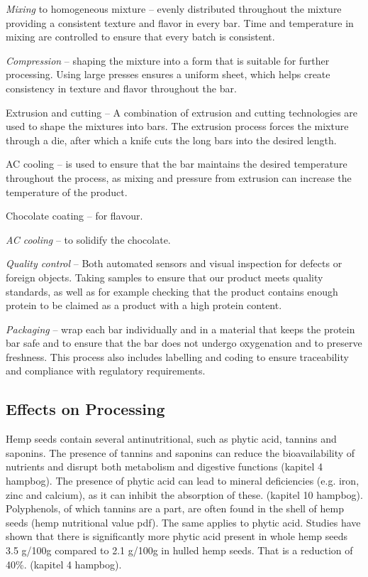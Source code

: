 \vspace{1em}
\textit{Mixing} to homogeneous mixture – evenly distributed throughout the mixture providing a consistent texture and flavor in every bar. Time and temperature in mixing are controlled to ensure that every batch is consistent.

\vspace{1em}
\textit{Compression} – shaping the mixture into a form that is suitable for further processing. Using large presses ensures a uniform sheet, which helps create consistency in texture and flavor throughout the bar.

\vspace{1em}
Extrusion and cutting – A combination of extrusion and cutting technologies are used to shape the mixtures into bars. The extrusion process forces the mixture through a die, after which a knife cuts the long bars into the desired length.

\vspace{1em}
AC cooling – is used to ensure that the bar maintains the desired temperature throughout the process, as mixing and pressure from extrusion can increase the temperature of the product.

\vspace{1em}
Chocolate coating – for flavour.

\vspace{1em}
\textit{AC cooling} – to solidify the chocolate.

\vspace{1em}
\textit{Quality control} – Both automated sensors and visual inspection for defects or foreign objects. Taking samples to ensure that our product meets quality standards, as well as for example checking that the product contains enough protein to be claimed as a product with a high protein content. 

\vspace{1em}
\textit{Packaging} – wrap each bar individually and in a material that keeps the protein bar safe and to ensure that the bar does not undergo oxygenation and to preserve freshness. This process also includes labelling and coding to ensure traceability and compliance with regulatory requirements.

\subsection{Effects on Processing}
Hemp seeds contain several antinutritional, such as phytic acid, tannins and saponins. The presence of tannins and saponins can reduce the bioavailability of nutrients and disrupt both metabolism and digestive functions (kapitel 4 hampbog). The presence of phytic acid can lead to mineral deficiencies (e.g. iron, zinc and calcium), as it can inhibit the absorption of these. (kapitel 10 hampbog). Polyphenols, of which tannins are a part, are often found in the shell of hemp seeds (hemp nutritional value pdf). The same applies to phytic acid. Studies have shown that there is significantly more phytic acid present in whole hemp seeds 3.5 g/100g compared to 2.1 g/100g in hulled hemp seeds. That is a reduction of 40\%. (kapitel 4 hampbog).

